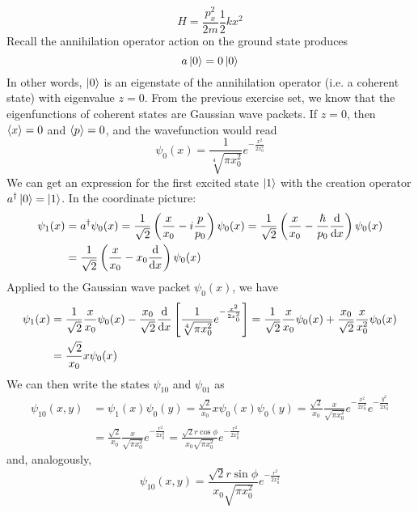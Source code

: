 \documentclass[11pt, a4paper]{article}
\begin{document}
\begin{itemize}
	\begin{equation*}
		H = \frac{p_{x}^{2}}{2m} \frac{1}{2}kx^{2}
	\end{equation*}
	Recall the annihilation operator action on the ground state produces
	\begin{equation*}
		a \ket{0} = 0 \ket{0}
	\end{equation*}
	In other words, $ \ket{0} $ is an eigenstate of the annihilation operator (i.e. a coherent state) with eigenvalue $ z = 0 $. From the previous exercise set, we know that the eigenfunctions of coherent states are Gaussian wave packets. If $ z = 0 $, then $ \ev{x} = 0 $ and $ \ev{p} = 0 $, and the wavefunction would read
	\begin{equation*}
		\psi_{0}(x) = \frac{1}{\sqrt[4]{\pi x_{0}^{2}}}e^{-\frac{x^{2}}{2x_{0}^{2}}}
	\end{equation*}
	We can get an expression for the first excited state $ \ket{1} $ with the creation operator $ a^{\dagger}\ket{0} = \ket{1} $. In the coordinate picture:
	\begin{align*}
		\psi_{1}(x) &= a^{\dagger}\psi_{0}(x) = \frac{1}{\sqrt{2}}\left(\frac{x}{x_{0}}-i\frac{p}{p_{0}}\right)\psi_{0}(x)  = \frac{1}{\sqrt{2}}\left(\frac{x}{x_{0}}-\frac{\hbar}{p_{0}}\dv{x}\right)\psi_{0}(x) \\
		& = \frac{1}{\sqrt{2}}\left(\frac{x}{x_{0}}-x_{0}\dv{x}\right)\psi_{0}(x)
	\end{align*}
	Applied to the Gaussian wave packet $ \psi_{0}(x) $, we have
	\begin{align*}
		\psi_{1}(x) &= \frac{1}{\sqrt{2}}\frac{x}{x_{0}}\psi_{0}(x) - \frac{x_{0}}{\sqrt{2}}\dv{x}\left[\frac{1}{\sqrt[4]{\pi x_{0}^{2}}}e^{-\frac{x^{2}}{2x_{0}^{2}}}\right] = \frac{1}{\sqrt{2}}\frac{x}{x_{0}}\psi_{0}(x) + \frac{x_{0}}{\sqrt{2}}\frac{x}{x_{0}^{2}}\psi_{0}(x)\\
		&=\frac{\sqrt{2}}{x_{0}}x\psi_{0}(x)
	\end{align*}
	We can then write the states $ \psi_{10} $ and $ \psi_{01} $ as
	\begin{align*}
		\psi_{10}(x, y) &= \psi_{1}(x)\psi_{0}(y) = \frac{\sqrt{2}}{x_{0}}x\psi_{0}(x)\psi_{0}(y) = \frac{\sqrt{2}}{x_{0}} \frac{x}{\sqrt{\pi x_{0}^{2}}}e^{-\frac{x^{2}}{2x_{0}^{2}}} e^{-\frac{y^{2}}{2x_{0}^{2}}}\\
		&=\frac{\sqrt{2}}{x_{0}}\frac{x}{\sqrt{\pi x_{0}^{2}}} e^{-\frac{r^{2}}{2x_{0}^{2}}} = \frac{\sqrt{2}r \cos \phi}{x_{0}\sqrt{\pi x_{0}^{2}}}e^{-\frac{r^{2}}{2x_{0}^{2}}}
	\end{align*}
	and, analogously, 
	\begin{equation*}
		\psi_{10}(x, y) = \frac{\sqrt{2}r \sin \phi}{x_{0}\sqrt{\pi x_{0}^{2}}}e^{-\frac{r^{2}}{2x_{0}^{2}}}
	\end{equation*}
	
\end{itemize}
\end{document}
